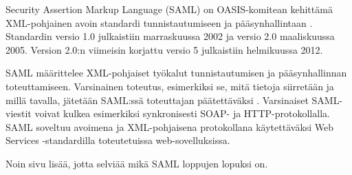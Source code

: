 Security Assertion Markup Language (SAML) on OASIS-komitean kehittämä XML-pohjainen avoin standardi tunnistautumiseen ja pääsynhallintaan \cite{saml_spec}. Standardin versio 1.0 julkaistiin marraskuussa 2002 ja versio 2.0 maaliskuussa 2005. Version 2.0:n viimeisin korjattu versio 5 julkaistiin helmikuussa 2012.

SAML määrittelee XML-pohjaiset työkalut tunnistautumisen ja pääsynhallinnan toteuttamiseen. Varsinainen toteutus, esimerkiksi se, mitä tietoja siirretään ja millä tavalla, jätetään SAML:ssä toteuttajan päätettäväksi \cite{dynamic_saml}. Varsinaiset SAML-viestit voivat kulkea esimerkiksi synkronisesti SOAP- ja HTTP-protokollalla. SAML soveltuu avoimena ja XML-pohjaisena protokollana käytettäväksi Web Services -standardilla toteutetuissa web-sovelluksissa.

Noin sivu lisää, jotta selviää mikä SAML loppujen lopuksi on.